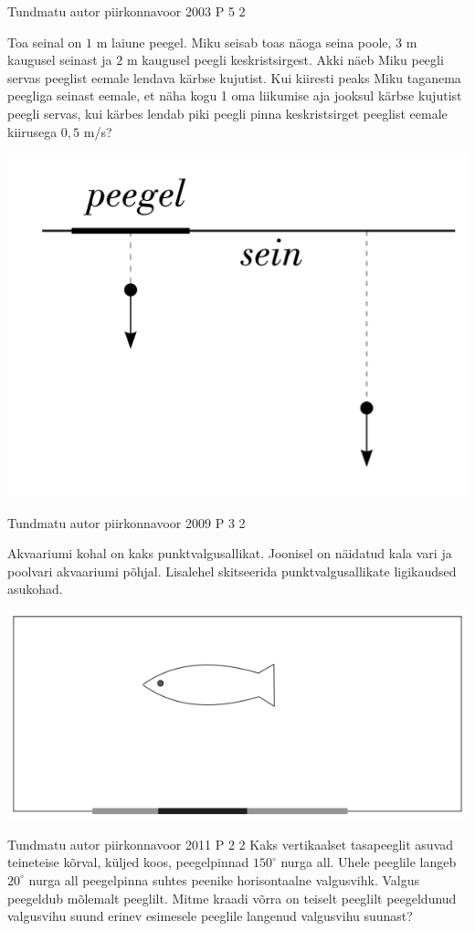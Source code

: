 \documentclass[11pt]{article}
\begin{document}
{%
{Tundmatu autor} %
{piirkonnavoor} %
{2003} %
{P 5} %
{2} %
{
\ifStatement
Toa seinal on $1$ m laiune peegel. Miku seisab toas näoga seina poole, $3$ m kaugusel seinast ja $2$ m kaugusel peegli keskristsirgest. Akki näeb Miku peegli servas peeglist eemale lendava kärbse kujutist. Kui kiiresti peaks Miku taganema peegliga seinast eemale, et näha kogu 1 oma liikumise aja jooksul kärbse kujutist peegli servas, kui kärbes lendab piki peegli pinna keskristsirget peeglist eemale kiirusega $0,5$ m/s?
\begin{center}
	\includegraphics[width=0.5\linewidth]{2003-v2p-05-yl.PNG}
\end{center}
\fi
}
 


{Tundmatu autor} %
{piirkonnavoor} %
{2009} %
{P 3} %
{2} %
{
\ifStatement
Akvaariumi kohal on kaks punktvalgusallikat. Joonisel on näidatud kala vari ja poolvari akvaariumi põhjal. Lisalehel skitseerida punktvalgusallikate ligikaudsed asukohad.
\begin{center}
	\includegraphics[width=0.5\linewidth]{2009-v2p-03-yl.PNG}
\end{center}
\fi
}


{Tundmatu autor} %
{piirkonnavoor} %
{2011} %
{P 2} %
{2} %
{
\ifStatement
Kaks vertikaalset tasapeeglit asuvad teineteise kõrval, küljed koos, peegelpinnad
$150^{\circ}$ nurga all. Uhele peeglile langeb $20^{\circ}$ nurga all peegelpinna suhtes peenike horisontaalne valgusvihk. Valgus peegeldub mõlemalt peeglilt. Mitme kraadi võrra on teiselt peeglilt peegeldunud valgusvihu suund erinev esimesele peeglile langenud valgusvihu suunast?
\fi
}


}
\end{document}
